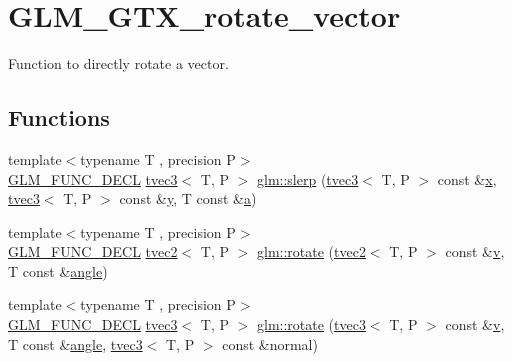 \hypertarget{group__gtx__rotate__vector}{}\section{G\+L\+M\+\_\+\+G\+T\+X\+\_\+rotate\+\_\+vector}
\label{group__gtx__rotate__vector}


Function to directly rotate a vector.  


\subsection*{Functions}
\begin{DoxyCompactItemize}
\item 
{\footnotesize template$<$typename T , precision P$>$ }\\\mbox{\hyperlink{setup_8hpp_ab2d052de21a70539923e9bcbf6e83a51}{G\+L\+M\+\_\+\+F\+U\+N\+C\+\_\+\+D\+E\+CL}} \mbox{\hyperlink{structglm_1_1tvec3}{tvec3}}$<$ T, P $>$ \mbox{\hyperlink{group__gtx__rotate__vector_gafc9ab3101c3f3799f3d5d6d9d3baac09}{glm\+::slerp}} (\mbox{\hyperlink{structglm_1_1tvec3}{tvec3}}$<$ T, P $>$ const \&\mbox{\hyperlink{glad_8h_a92d0386e5c19fb81ea88c9f99644ab1d}{x}}, \mbox{\hyperlink{structglm_1_1tvec3}{tvec3}}$<$ T, P $>$ const \&\mbox{\hyperlink{glad_8h_a66ddd433d2cacfe27f5906b7e86faeed}{y}}, T const \&\mbox{\hyperlink{glad_8h_ac8729153468b5dcf13f971b21d84d4e5}{a}})
\item 
{\footnotesize template$<$typename T , precision P$>$ }\\\mbox{\hyperlink{setup_8hpp_ab2d052de21a70539923e9bcbf6e83a51}{G\+L\+M\+\_\+\+F\+U\+N\+C\+\_\+\+D\+E\+CL}} \mbox{\hyperlink{structglm_1_1tvec2}{tvec2}}$<$ T, P $>$ \mbox{\hyperlink{group__gtx__rotate__vector_ga9bff444fb191e2e089a906b899cd033d}{glm\+::rotate}} (\mbox{\hyperlink{structglm_1_1tvec2}{tvec2}}$<$ T, P $>$ const \&\mbox{\hyperlink{glad_8h_a14cfbe2fc2234f5504618905b69d1e06}{v}}, T const \&\mbox{\hyperlink{group__gtc__quaternion_gad4a4448baedb198b2b1e7880d2544dc9}{angle}})
\item 
{\footnotesize template$<$typename T , precision P$>$ }\\\mbox{\hyperlink{setup_8hpp_ab2d052de21a70539923e9bcbf6e83a51}{G\+L\+M\+\_\+\+F\+U\+N\+C\+\_\+\+D\+E\+CL}} \mbox{\hyperlink{structglm_1_1tvec3}{tvec3}}$<$ T, P $>$ \mbox{\hyperlink{group__gtx__rotate__vector_ga526b6f8995bc0946aa1a04e9297de7c6}{glm\+::rotate}} (\mbox{\hyperlink{structglm_1_1tvec3}{tvec3}}$<$ T, P $>$ const \&\mbox{\hyperlink{glad_8h_a14cfbe2fc2234f5504618905b69d1e06}{v}}, T const \&\mbox{\hyperlink{group__gtc__quaternion_gad4a4448baedb198b2b1e7880d2544dc9}{angle}}, \mbox{\hyperlink{structglm_1_1tvec3}{tvec3}}$<$ T, P $>$ const \&normal)

\end{DoxyCompactItemize}
